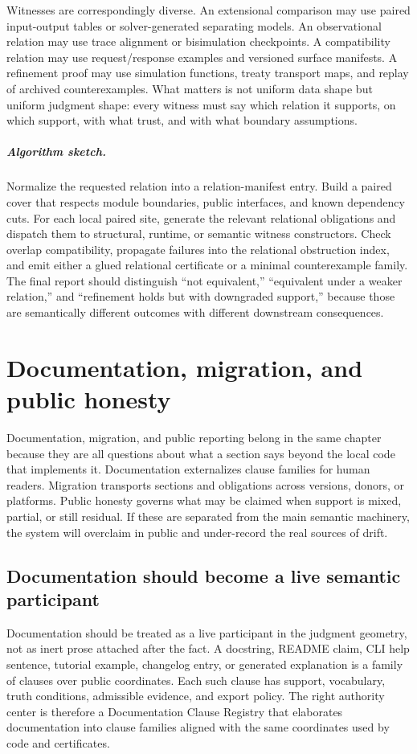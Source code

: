 \documentclass[11pt]{report}
\begin{document}
Witnesses are correspondingly diverse. An extensional comparison may use paired input-output tables or solver-generated separating models. An observational relation may use trace alignment or bisimulation checkpoints. A compatibility relation may use request/response examples and versioned surface manifests. A refinement proof may use simulation functions, treaty transport maps, and replay of archived counterexamples. What matters is not uniform data shape but uniform judgment shape: every witness must say which relation it supports, on which support, with what trust, and with what boundary assumptions.

\paragraph{Algorithm sketch.}
Normalize the requested relation into a relation-manifest entry. Build a paired cover that respects module boundaries, public interfaces, and known dependency cuts. For each local paired site, generate the relevant relational obligations and dispatch them to structural, runtime, or semantic witness constructors. Check overlap compatibility, propagate failures into the relational obstruction index, and emit either a glued relational certificate or a minimal counterexample family. The final report should distinguish ``not equivalent,'' ``equivalent under a weaker relation,'' and ``refinement holds but with downgraded support,'' because those are semantically different outcomes with different downstream consequences.
\chapter{Documentation, migration, and public honesty}
Documentation, migration, and public reporting belong in the same chapter because they are all questions about what a section says beyond the local code that implements it. Documentation externalizes clause families for human readers. Migration transports sections and obligations across versions, donors, or platforms. Public honesty governs what may be claimed when support is mixed, partial, or still residual. If these are separated from the main semantic machinery, the system will overclaim in public and under-record the real sources of drift.
\section{Documentation should become a live semantic participant}
Documentation should be treated as a live participant in the judgment geometry, not as inert prose attached after the fact. A docstring, README claim, CLI help sentence, tutorial example, changelog entry, or generated explanation is a family of clauses over public coordinates. Each such clause has support, vocabulary, truth conditions, admissible evidence, and export policy. The right authority center is therefore a Documentation Clause Registry that elaborates documentation into clause families aligned with the same coordinates used by code and certificates.
\end{document}
